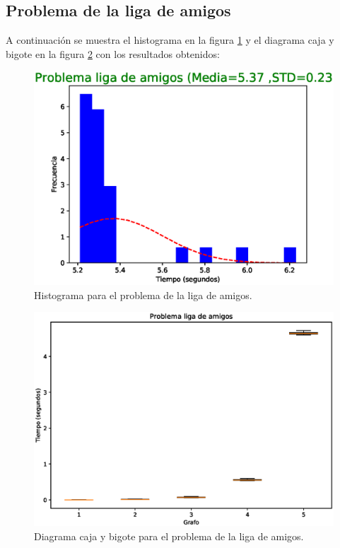 \documentclass{article}
\begin{document}
\subsection{Problema de la liga de amigos}
A continuación se muestra el histograma en la figura \ref{fig:H3} y el diagrama caja y bigote en la figura \ref{fig:BP3} con los resultados obtenidos:
\begin{figure}[H]
    \includegraphics[width=\textwidth]{H3}
    \caption{Histograma para el problema de la liga de amigos.}
    \label{fig:H3}
\end{figure}
\begin{figure}[H]
    \includegraphics[width=\textwidth]{BP3}
    \caption{Diagrama caja y bigote para el problema de la liga de amigos.}
    \label{fig:BP3}
\end{figure}
\end{document}
